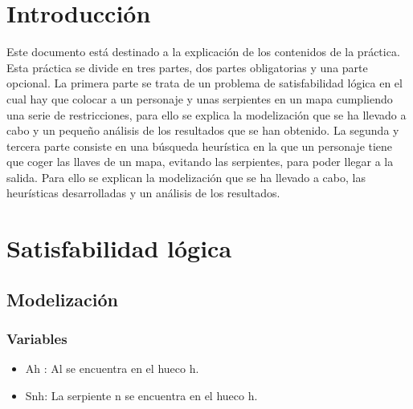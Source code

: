\documentclass[11pt,spanish]{article}
\begin{document}


	\section{Introducción}
	Este documento está destinado a la explicación de los contenidos de la práctica. Esta práctica se divide en tres partes, dos partes obligatorias y una parte opcional. La primera parte se trata de un problema de satisfabilidad lógica en el cual hay que colocar a un personaje y unas serpientes en un mapa cumpliendo una serie de restricciones, para ello se explica la modelización que se ha llevado a cabo y un pequeño análisis de los resultados que se han obtenido. La segunda y tercera parte consiste en una búsqueda heurística en la que un personaje tiene que coger las llaves de un mapa, evitando las serpientes, para poder llegar a la salida. Para ello se explican la modelización que se ha llevado a cabo, las heurísticas desarrolladas y un análisis de los resultados. 
	\section{Satisfabilidad lógica}
		\subsection{Modelización}
			\subsubsection{Variables}
			\begin{itemize}
				\item Ah : Al se encuentra en el hueco h.
				\item Snh: La serpiente n se encuentra en el hueco h.
			\end{itemize}
\end{document}
